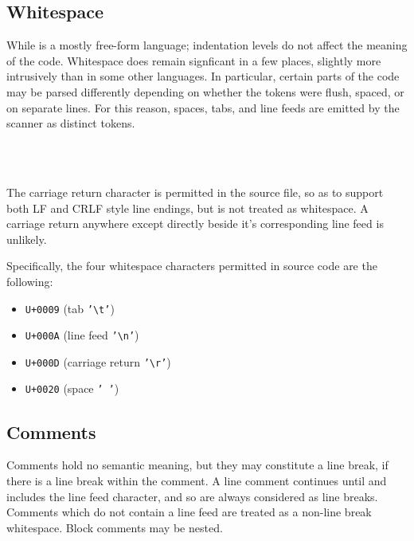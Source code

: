 \subsection{Whitespace}

While \Trilogy{} is a mostly free-form language; indentation levels do not affect
the meaning of the code. Whitespace does remain signficant in a few places, slightly
more intrusively than in some other languages. In particular, certain parts of the
code may be parsed differently depending on whether the tokens were flush, spaced, or
on separate lines. For this reason, spaces, tabs, and line feeds are emitted by the
scanner as distinct tokens.

\begin{bnf*}
     \\
     \\
\end{bnf*}

The carriage return character is permitted in the source file, so as to support both
LF and CRLF style line endings, but is not treated as whitespace. A carriage return
anywhere except directly beside it's corresponding line feed is unlikely.

Specifically, the four whitespace characters permitted in \Trilogy{} source code
are the following:

\begin{itemize}
    \item \texttt{U+0009} (tab \texttt{'\textbackslash t'})
    \item \texttt{U+000A} (line feed \texttt{'\textbackslash n'})
    \item \texttt{U+000D} (carriage return \texttt{'\textbackslash r'})
    \item \texttt{U+0020} (space \texttt{' '})
\end{itemize}

\subsection{Comments}

Comments hold no semantic meaning, but they may constitute a line break,
if there is a line break within the comment. A line comment continues until and
includes the line feed character, and so are always considered as line breaks.
Comments which do not contain a line feed are treated as a non-line
break whitespace. Block comments may be nested.

